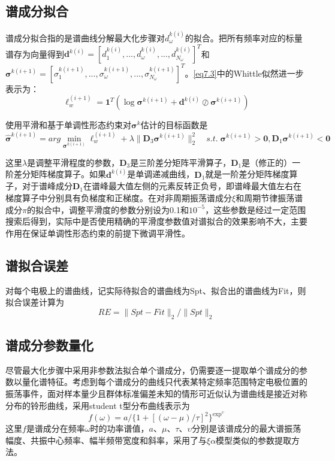 \subsection{谱成分拟合}
谱成分拟合指的是谱曲线分解最大化步骤对$d_\omega^{k(i)}$的拟合。把所有频率对应的标量谱存为向量得到$\mathbf{d}^{k(i)}=[d_1^{k(i)},...,d_\omega^{k(i)},...,d_{N_\omega}^{k(i)}]^T$和$\mathbf{\sigma}^{k(i+1)}=[\sigma_1^{k(i+1)},...,\sigma_\omega^{k(i+1)},...,\sigma_{N_\omega}^{k(i+1)}]^T$。\eqref{eq7.3}中的Whittle似然进一步表示为：
\begin{equation}\label{eq7.11}
\ell_w^{(i+1)}=\mathbf{1}^T(\log{\mathbf{\sigma}}^{k(i+1)}+\mathbf{d}^{k(i)}\oslash{\mathbf{\sigma}^{k(i+1)}})
\end{equation}

使用平滑和基于单调性形态约束对$\mathbf{\sigma}^k$估计的目标函数是
\begin{equation}\label{eq7.12}
\hat{\mathbf{\sigma}}^{k(i+1)}=arg\min_{\mathbf{\sigma}^{k(i+1)}}\ell_w^{(i+1)}+\lambda\lVert\mathbf{D}_3\mathbf{\sigma}^{k(i+1)}\rVert_2^2\quad
s.t.\;\mathbf{\sigma}^{k(i+1)}>\mathbf{0},\mathbf{D}_1\mathbf{\sigma}^{k(i+1)}<\mathbf{0}
\end{equation}

这里$\lambda$是调整平滑程度的参数，$\mathbf{D}_3$是三阶差分矩阵平滑算子，$\mathbf{D}_1$是（修正的）一阶差分矩阵梯度算子。如果$\mathbf{d}^{k(i)}$是单调递减曲线，$\mathbf{D}_1$就是一阶差分矩阵梯度算子，对于谱峰成分$\mathbf{D}_1$在谱峰最大值左侧的元素反转正负号，即谱峰最大值左右在梯度算子中分别具有负梯度和正梯度。在对非周期振荡谱成分$\xi$和周期节律振荡谱成分$\pi$的拟合中，调整平滑度的参数分别设为0.1和$10^{-5}$，这些参数是经过一定范围搜索后得到，实际中是否使用精确的平滑度参数值对谱拟合的效果影响不大，主要作用在保证单调性形态约束的前提下微调平滑性。

\subsection{谱拟合误差}
对每个电极上的谱曲线，记实际待拟合的谱曲线为Spt、拟合出的谱曲线为Fit，则拟合误差计算为
\begin{equation}\label{eq7.13}
RE = \lVert{Spt-Fit}\rVert_2/\lVert{Spt}\rVert_2
\end{equation}

\subsection{谱成分参数量化}
尽管最大化步骤中采用非参数法拟合单个谱成分，仍需要逐一提取单个谱成分的参数以量化谱特征。考虑到每个谱成分的曲线只代表某特定频率范围特定电极位置的振荡事件，面对样本量少且群体标准偏差未知的情形可近似认为谱曲线是接近对称分布的铃形曲线，采用student t型分布曲线表示为
\begin{equation}\label{eq7.14}
f(\omega)=a/\lbrace1+[(\omega-\mu)/\tau]^2\rbrace^{\exp^\upsilon}
\end{equation}
这里$f$是谱成分在频率$\omega$时的功率谱值，$a$、$\mu$、$\tau$、$\upsilon$分别是该谱成分的最大谱振荡幅度、共振中心频率、幅半频带宽度和斜率，采用了与$\xi\alpha$模型类似的参数提取方法。

